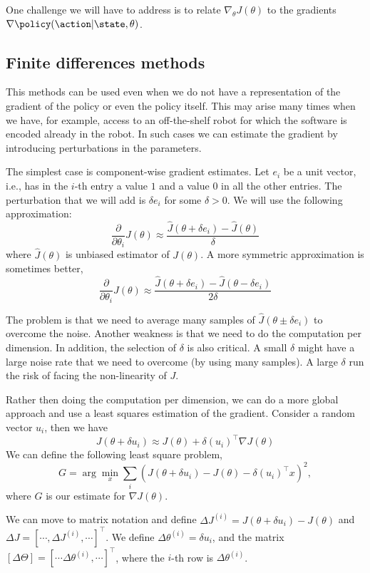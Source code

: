 One challenge we will have to address is to relate $\nabla_\theta
J(\theta)$ to the gradients $\nabla \policy(\action|\state,\theta)$.

\subsection{Finite differences methods}

This methods can be used even when we do not have a representation
of the gradient of the policy or even the policy itself. This may
arise many times when we have, for example, access to an
off-the-shelf robot for which the software is encoded already in the
robot. In such cases we can estimate the gradient by introducing
perturbations in the parameters.

The simplest case is component-wise gradient estimates. Let $e_i$ be
a unit vector, i.e., has in the $i$-th entry a value $1$ and a value
$0$ in all the other entries. The perturbation that we will add is
$\delta e_i$ for some $\delta >0$. We will use the following
approximation:
\[
\frac{\partial}{\partial \theta_i}J(\theta)\approx
\frac{\hat{J}(\theta+\delta e_i)-\hat{J}(\theta)}{\delta}
\]
where $\hat{J}(\theta)$ is unbiased estimator of $J(\theta)$. A more
symmetric approximation is sometimes better,
\[
\frac{\partial}{\partial \theta_i}J(\theta)\approx
\frac{\hat{J}(\theta+\delta e_i)-\hat{J}(\theta-\delta e_i
)}{2\delta}
\]

The problem is that we need to average many samples of
$\hat{J}(\theta\pm\delta e_i)$ to overcome the noise. Another
weakness is that we need to do the computation per dimension. In
addition, the selection of $\delta$ is also critical. A small
$\delta$ might have a large noise rate that we need to overcome (by
using many samples). A large $\delta$ run the risk of facing the
non-linearity of $J$.

Rather then doing the computation per dimension, we can do a more
global approach and use a least squares estimation of the gradient.
Consider a random vector $u_i$, then we have
\[
J(\theta+\delta u_i)\approx J(\theta)+\delta (u_i)^\top \nabla
J(\theta)
\]
We can define the following least square problem,
\[
G= \arg\min_x \sum_i (J(\theta+\delta u_i)- J(\theta)-\delta
(u_i)^\top x)^2,
\]
where $G$ is our estimate for $\nabla J(\theta)$.

We can move to matrix notation and define $\Delta
J^{(i)}=J(\theta+\delta u_i)- J(\theta)$ and $\Delta J= [\cdots ,
\Delta J^{(i)}, \cdots]^\top$. We define $\Delta \theta^{(i)}=\delta
u_i$, and the matrix $[\Delta\Theta]=[\cdots
\Delta\theta^{(i)},\cdots]^\top$, where the $i$-th row is
$\Delta\theta^{(i)}$.

